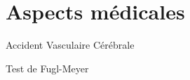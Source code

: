 \section{Aspects médicales}

\begin{frame}{Accident Vasculaire Cérébrale}
\end{frame}

\begin{frame}{Test de Fugl-Meyer}
\end{frame}